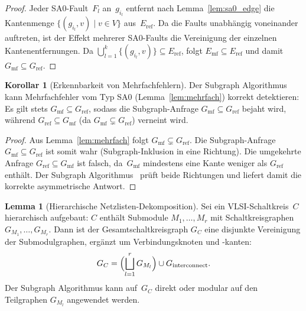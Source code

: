﻿\documentclass[a4paper,12pt]{article}
\theoremstyle{definition}
\newtheorem{lemma}{Lemma}
\newtheorem{korollar}{Korollar}
\begin{document}
\begin{proof}
  Jeder SA0-Fault~$F_l$ an~$g_{i_l}$ entfernt nach Lemma~\ref{lem:sa0_edge}
  die Kantenmenge $\{(g_{i_l}, v) \mid v \in V\}$ aus~$E_{\mathrm{ref}}$.
  Da die Faults unabhängig voneinander auftreten, ist der Effekt mehrerer
  SA0-Faults die Vereinigung der einzelnen Kantenentfernungen.
  Da $\bigcup_{l=1}^k \{(g_{i_l}, v)\} \subseteq E_{\mathrm{ref}}$, folgt
  $E_{\mathrm{mf}} \subseteq E_{\mathrm{ref}}$ und damit
  $G_{\mathrm{mf}} \subseteq G_{\mathrm{ref}}$.
\end{proof}

\begin{korollar}[Erkennbarkeit von Mehrfachfehlern]
  \label{kor:mehrfach}
  Der Subgraph Algorithmus kann Mehrfachfehler vom Typ SA0
  (Lemma~\ref{lem:mehrfach}) korrekt detektieren: Es gilt stets
  $G_{\mathrm{mf}} \subseteq G_{\mathrm{ref}}$, sodass die
  Subgraph-Anfrage $G_{\mathrm{mf}} \subseteq G_{\mathrm{ref}}$ bejaht
  wird, während $G_{\mathrm{ref}} \subseteq G_{\mathrm{mf}}$ (da
  $G_{\mathrm{mf}} \subsetneq G_{\mathrm{ref}}$) verneint wird.
\end{korollar}

\begin{proof}
  Aus Lemma~\ref{lem:mehrfach} folgt $G_{\mathrm{mf}} \subsetneq G_{\mathrm{ref}}$.
  Die Subgraph-Anfrage $G_{\mathrm{mf}} \subseteq G_{\mathrm{ref}}$ ist
  somit wahr (Subgraph-Inklusion in eine Richtung).
  Die umgekehrte Anfrage $G_{\mathrm{ref}} \subseteq G_{\mathrm{mf}}$ ist
  falsch, da~$G_{\mathrm{mf}}$ mindestens eine Kante weniger als
  $G_{\mathrm{ref}}$ enthält.
  Der Subgraph Algorithmus~\cite{epp2026subgraph} prüft beide Richtungen
  und liefert damit die korrekte asymmetrische Antwort.
\end{proof}

\begin{lemma}[Hierarchische Netzlisten-Dekomposition]
  \label{lem:hierarchie}
  Sei ein VLSI-Schaltkreis~$C$ hierarchisch aufgebaut: $C$ enthält
  Submodule $M_1, \ldots, M_r$ mit Schaltkreisgraphen
  $G_{M_1}, \ldots, G_{M_r}$.
  Dann ist der Gesamtschaltkreisgraph $G_C$ eine disjunkte Vereinigung
  der Submodul\-graphen, ergänzt um Verbindungsknoten und -kanten:
  \[
    G_C
    = \Bigl(\bigsqcup_{l=1}^{r} G_{M_l}\Bigr) \cup G_{\mathrm{interconnect}}.
  \]
  Der Subgraph Algorithmus kann auf~$G_C$ direkt oder modular auf den
  Teilgraphen $G_{M_l}$ angewendet werden.
\end{lemma}
\end{document}
